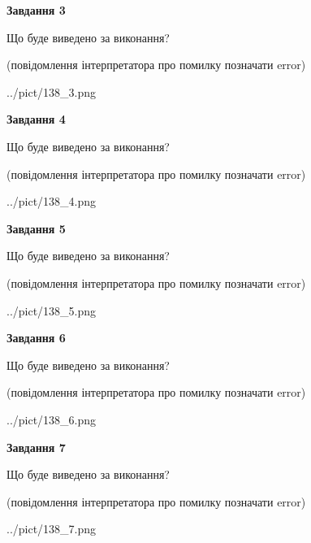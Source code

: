 \documentclass[12pt, ukrainian]{article}
\begin{document}
{\begin {large}
{\begin {center}\textbf{Завдання 3}\end {center}}\par
Що буде виведено за виконання?\par
 (повідомлення інтерпретатора про помилку позначати error)\par
\begin{center}
	{../pict/138_3.png}
\end{center}
\newpage

{\begin {center}\textbf{Завдання 4}\end {center}}\par
Що буде виведено за виконання?\par
 (повідомлення інтерпретатора про помилку позначати error)\par
\begin{center}
	{../pict/138_4.png}
\end{center}
\newpage

{\begin {center}\textbf{Завдання 5}\end {center}}\par
Що буде виведено за виконання?\par
 (повідомлення інтерпретатора про помилку позначати error)\par
\begin{center}
	{../pict/138_5.png}
\end{center}
\newpage

{\begin {center}\textbf{Завдання 6}\end {center}}\par
Що буде виведено за виконання?\par
 (повідомлення інтерпретатора про помилку позначати error)\par
\begin{center}
	{../pict/138_6.png}
\end{center}
\newpage

{\begin {center}\textbf{Завдання 7}\end {center}}\par
Що буде виведено за виконання?\par
 (повідомлення інтерпретатора про помилку позначати error)\par
\begin{center}
	{../pict/138_7.png}
\end{center}
\newpage


\end{large}}
\end{document}
